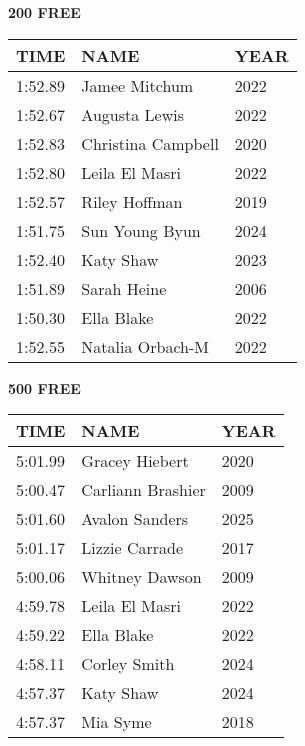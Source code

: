 \vspace{0.4cm}

\begin{minipage}[t]{0.48\textwidth}
\centering
\textbf{200 FREE}\\[0.05cm]
\begin{tabular}{@{}p{1.8cm}p{2.8cm}p{1.2cm}@{}}
\hline
\textbf{TIME} & \textbf{NAME} & \textbf{YEAR} \\
\hline
1:52.89 & Jamee Mitchum & 2022 \\
1:52.67 & Augusta Lewis & 2022 \\
1:52.83 & Christina Campbell & 2020 \\
1:52.80 & Leila El Masri & 2022 \\
1:52.57 & Riley Hoffman & 2019 \\
1:51.75 & Sun Young Byun & 2024 \\
1:52.40 & Katy Shaw & 2023 \\
1:51.89 & Sarah Heine & 2006 \\
1:50.30 & Ella Blake & 2022 \\
1:52.55 & Natalia Orbach-M & 2022 \\
\hline
\end{tabular}
\end{minipage}\hfill
\begin{minipage}[t]{0.48\textwidth}
\centering
\textbf{500 FREE}\\[0.05cm]
\begin{tabular}{@{}p{1.8cm}p{2.8cm}p{1.2cm}@{}}
\hline
\textbf{TIME} & \textbf{NAME} & \textbf{YEAR} \\
\hline
5:01.99 & Gracey Hiebert & 2020 \\
5:00.47 & Carliann Brashier & 2009 \\
5:01.60 & Avalon Sanders & 2025 \\
5:01.17 & Lizzie Carrade & 2017 \\
5:00.06 & Whitney Dawson & 2009 \\
4:59.78 & Leila El Masri & 2022 \\
4:59.22 & Ella Blake & 2022 \\
4:58.11 & Corley Smith & 2024 \\
4:57.37 & Katy Shaw & 2024 \\
4:57.37 & Mia Syme & 2018 \\
\hline
\end{tabular}
\end{minipage}

\vspace{0.4cm}

